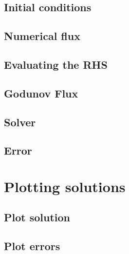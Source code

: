 \documentclass[11pt,a4paper]{article}
\begin{document}
\subsection{Initial conditions}\label{IC}


\subsection{Numerical flux}\label{flux}


\subsection{Evaluating the RHS}\label{rhs}


\subsection{Godunov Flux}\label{G_flux}


\subsection{Solver}\label{solver}


\subsection{Error}\label{error}


\section{Plotting solutions}\label{plot}


\subsection{Plot solution}\label{plot_sol}


\subsection{Plot errors}\label{plot_err}

\end{document}
